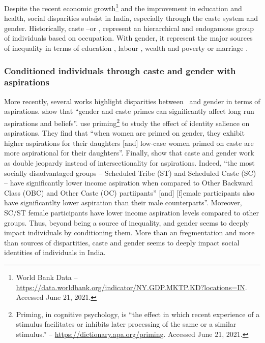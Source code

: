 \documentclass[a4paper, 11pt, onecolumn]{article}
\begin{document}
Despite the recent economic growth\footnote{World Bank Data -- \url{https://data.worldbank.org/indicator/NY.GDP.MKTP.KD?locations=IN}. Accessed June 21, 2021.} and the improvement in education and health, social disparities subsist in India, especially through the caste system and gender.
Historically, caste --or \jati, represent an hierarchical and endogamous group of individuals based on occupation.
With gender, it represent the major sources of inequality in terms of education \citep{Munshi2006, Hasan2006, Saha2013}, labour \citep{Madheswaran2007, Mohanty2006, Das2012}, wealth and poverty \citep{Borooah2005b, Zacharias2011, Deshpande2000, EsteveVolart2004} or marriage \citep{Banerjee2009, Chacko2003}.

		\subsubsection{Conditioned individuals through caste and gender with aspirations}
More recently, several works highlight disparities between \jati ~and gender in terms of aspirations.
\cite{Mukherjee2017} show that ``gender and caste primes can significantly affect long run aspirations and beliefs''. 
\cite{Alvi2019} use priming\footnote{Priming, in cognitive psychology, is ``the effect in which recent experience of a stimulus facilitates or inhibits later processing of the same or a similar stimulus.'' -- \url{https://dictionary.apa.org/priming}. Accessed June 21, 2021.} to study the effect of identity salience on aspirations.
They find that ``when women are primed on gender, they exhibit higher aspirations for their daughters [and] low-case  women primed on caste are more aspirational for their daughters''.
Finally, \cite{Sarkar2020} show that caste and gender work as double jeopardy instead of intersectionality for aspirations.
Indeed, ``the most socially disadvantaged groups -- Scheduled Tribe (ST) and Scheduled Caste (SC) -- have significantly lower income aspiration when compared to Other Backward Class (OBC) and Other Caste (OC) partiipants'' [and] [f]emale participants also have significantlty lower aspiration than their male counterparts''.
Moreover, SC/ST female participants have lower income aspiration levels compared to other groups.
Thus, beyond being a source of inequality, \jati and gender seems to deeply impact individuals by conditioning them.
More than an fregmentation and more than sources of dispartities, caste and gender seems to deeply impact social identities of individuals in India.
\end{document}
